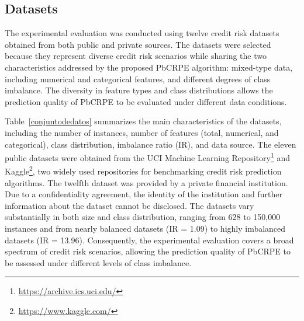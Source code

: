 {\subsection{Datasets}

The experimental evaluation was conducted using twelve credit risk datasets obtained from both public and private sources. The datasets were selected because they represent diverse credit risk scenarios while sharing the two characteristics addressed by the proposed PbCRPE algorithm: mixed-type data, including numerical and categorical features, and different degrees of class imbalance. The diversity in feature types and class distributions allows the prediction quality of PbCRPE to be evaluated under different data conditions.\newline

Table~\ref{conjuntodedatos} summarizes the main characteristics of the datasets, including the number of instances, number of features (total, numerical, and categorical), class distribution, imbalance ratio (IR), and data source. The eleven public datasets were obtained from the UCI Machine Learning Repository\footnote{\url{https://archive.ics.uci.edu/}} and Kaggle\footnote{\url{https://www.kaggle.com/}}, two widely used repositories for benchmarking credit risk prediction algorithms. The twelfth dataset was provided by a private financial institution. Due to a confidentiality agreement, the identity of the institution and further information about the dataset cannot be disclosed. The datasets vary substantially in both size and class distribution, ranging from 628 to 150,000 instances and from nearly balanced datasets (IR = 1.09) to highly imbalanced datasets (IR = 13.96). Consequently, the experimental evaluation covers a broad spectrum of credit risk scenarios, allowing the prediction quality of PbCRPE to be assessed under different levels of class imbalance.
	\begin{table}[H]
		\centering
		\caption{Characteristics of the twelve credit risk datasets used in the experimental evaluation.}
		\label{conjuntodedatos}
\end{table}}
